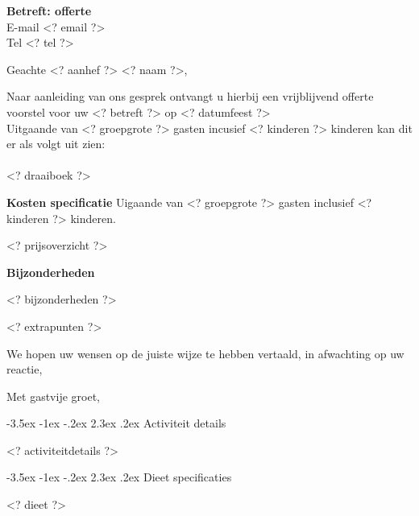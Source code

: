 \documentclass{letter}
\makeatletter
\newcommand\section{\@startsection {section}{1}{\z@}%
                                   {-3.5ex \@plus -1ex \@minus -.2ex}%
                                   {2.3ex \@plus.2ex}%
                                   {\normalfont\Large\bfseries}}
\makeatother
\begin{document}

\signature{Pedro Klooster}
\address{<? naam ?>\\ <? adress ?>\\ <? postcode ?> <? plaats ?>}
\begin{letter}{
\textbf{Betreft: offerte}\\%
  E-mail <? email  ?>\\
  Tel <? tel ?>
	}
\thispagestyle{empty}


\opening{Geachte <? aanhef ?> <? naam ?>,}

Naar aanleiding van ons gesprek ontvangt u hierbij een vrijblijvend offerte voorstel
voor uw <? betreft ?> op <? datumfeest ?> \\

Uitgaande van <? groepgrote ?> gasten incusief <? kinderen ?> kinderen kan dit er als volgt uit zien: \\\\
<? draaiboek ?>

\newpage


\textbf{Kosten specificatie}
Uigaande van <? groepgrote ?> gasten inclusief <? kinderen ?> kinderen.

<? prijsoverzicht ?>

\textbf{Bijzonderheden}

<? bijzonderheden ?>

<? extrapunten ?>

We hopen uw wensen op de juiste wijze te hebben vertaald, in afwachting op uw reactie, \\

\closing{Met gastvije groet,}


\end{letter}

\newpage

\section{Activiteit details}

<? activiteitdetails ?>

\section{Dieet specificaties}

<? dieet ?>
\end{document}
